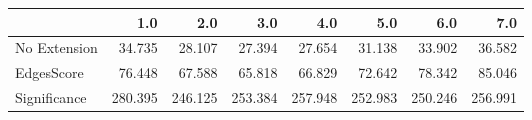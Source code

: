 \begin{tabular}{lrrrrrrr}
\toprule
{} &     1.0 &     2.0 &     3.0 &     4.0 &     5.0 &     6.0 &     7.0 \\
\midrule
No Extension &  34.735 &  28.107 &  27.394 &  27.654 &  31.138 &  33.902 &  36.582 \\
EdgesScore   &  76.448 &  67.588 &  65.818 &  66.829 &  72.642 &  78.342 &  85.046 \\
Significance & 280.395 & 246.125 & 253.384 & 257.948 & 252.983 & 250.246 & 256.991 \\
\bottomrule
\end{tabular}
